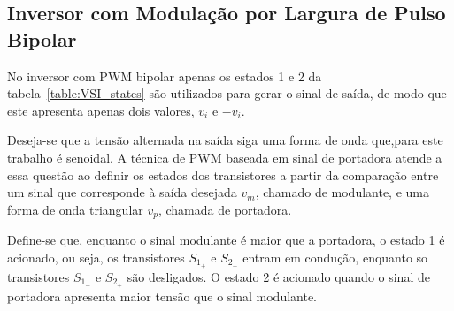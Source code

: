 \documentclass[
	12pt,				%
	openany,
	onseside,
	a4paper,			%
	english,			%
	french,				%
	spanish,			%
	brazil,				%
	]{abntex2}
\begin{document}
\subsection{Inversor com Modulação por Largura de Pulso Bipolar}

No inversor com PWM bipolar apenas os estados 1 e 2 da tabela~\ref{table:VSI_states} são utilizados para gerar o sinal de saída, de modo que este apresenta apenas dois valores, $v_i$ e $-v_i$.

Deseja-se que a tensão alternada na saída siga uma forma de onda que,para este trabalho é senoidal. A técnica de PWM baseada em sinal de portadora atende a essa questão ao definir os estados dos transistores a partir da comparação entre um sinal que corresponde à saída desejada $v_m$, chamado de modulante, e uma forma de onda triangular $v_p$, chamada de portadora.

Define-se que, enquanto o sinal modulante é maior que a portadora, o estado 1 é acionado, ou seja, os transistores $S_{1_+}$ e $S_{2_-}$ entram em condução, enquanto so transistores $S_{1_-}$ e $S_{2_+}$ são desligados. O estado 2 é acionado quando o sinal de portadora apresenta maior tensão que o sinal modulante. 
\end{document}
